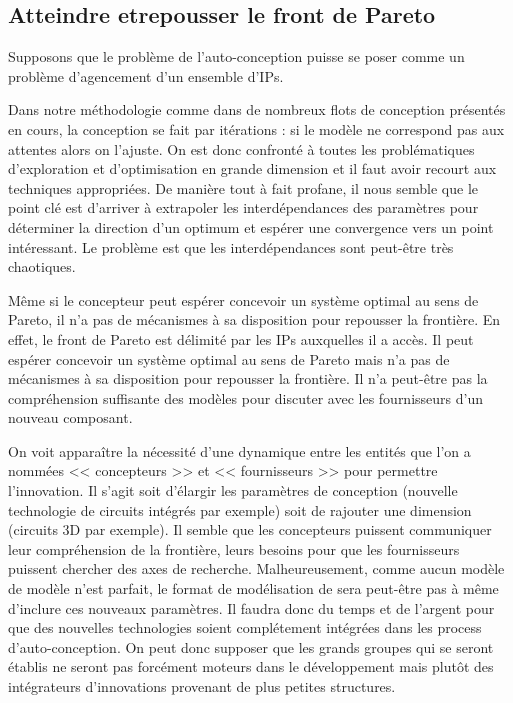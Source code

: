 \subsection{Atteindre etrepousser le front de Pareto}

Supposons que le problème de l'auto-conception puisse se poser comme un problème
d'agencement d'un ensemble d'IPs.

Dans notre méthodologie comme dans de nombreux flots de conception présentés en
cours, la conception se fait par itérations : si le modèle ne correspond pas aux
attentes alors on l'ajuste. On est donc confronté à toutes les problématiques
d'exploration et d'optimisation en grande dimension et il faut avoir recourt aux
techniques appropriées. De manière tout à fait profane, il nous semble que le
point clé est d'arriver à extrapoler les interdépendances des paramètres pour
déterminer la direction d'un optimum et espérer une convergence vers un point
intéressant. Le problème est que les interdépendances sont peut-être très
chaotiques.

Même si le concepteur peut espérer concevoir un système optimal au sens de
Pareto, il n'a pas de mécanismes à sa disposition pour repousser la frontière.
En effet, le front de Pareto est délimité par les IPs auxquelles il a accès.
Il peut espérer concevoir un système optimal au sens de Pareto mais n'a pas de
mécanismes à sa disposition pour repousser la frontière. Il n'a peut-être pas la
compréhension suffisante des modèles pour discuter avec les fournisseurs d'un
nouveau composant.

On voit apparaître la nécessité d'une dynamique entre les entités que l'on a
nommées << concepteurs >> et << fournisseurs >> pour permettre l'innovation.
Il s'agit soit d'élargir les paramètres de conception (nouvelle technologie de
circuits intégrés par exemple) soit de rajouter une dimension (circuits 3D par
exemple). Il semble que les concepteurs puissent communiquer leur compréhension
de la frontière, leurs besoins pour que les fournisseurs puissent chercher des
axes de recherche. Malheureusement, comme aucun modèle de modèle n'est parfait,
le format de modélisation de sera peut-être pas à même d'inclure ces nouveaux
paramètres. Il faudra donc du temps et de l'argent pour que des nouvelles
technologies soient complétement intégrées dans les process d'auto-conception.
On peut donc supposer que les grands groupes qui se seront établis ne seront pas
forcément moteurs dans le développement mais plutôt des intégrateurs
d'innovations provenant de plus petites structures.

